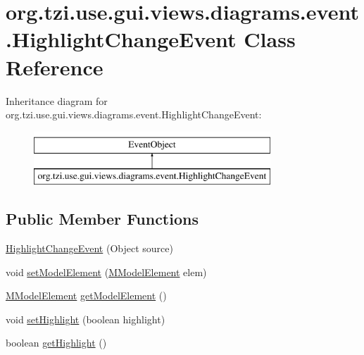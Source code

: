 \hypertarget{classorg_1_1tzi_1_1use_1_1gui_1_1views_1_1diagrams_1_1event_1_1_highlight_change_event}{\section{org.\-tzi.\-use.\-gui.\-views.\-diagrams.\-event.\-Highlight\-Change\-Event Class Reference}
\label{classorg_1_1tzi_1_1use_1_1gui_1_1views_1_1diagrams_1_1event_1_1_highlight_change_event}
}
Inheritance diagram for org.\-tzi.\-use.\-gui.\-views.\-diagrams.\-event.\-Highlight\-Change\-Event\-:\begin{figure}[H]
\begin{center}
\leavevmode
\includegraphics[height=2.000000cm]{classorg_1_1tzi_1_1use_1_1gui_1_1views_1_1diagrams_1_1event_1_1_highlight_change_event}
\end{center}
\end{figure}
\subsection*{Public Member Functions}
\begin{DoxyCompactItemize}
\item 
\hyperlink{classorg_1_1tzi_1_1use_1_1gui_1_1views_1_1diagrams_1_1event_1_1_highlight_change_event_a44aa5a93b6c7e41cb79c1029546279d3}{Highlight\-Change\-Event} (Object source)
\item 
void \hyperlink{classorg_1_1tzi_1_1use_1_1gui_1_1views_1_1diagrams_1_1event_1_1_highlight_change_event_a8bd301afb193ff3b5a89ad8994da73d2}{set\-Model\-Element} (\hyperlink{interfaceorg_1_1tzi_1_1use_1_1uml_1_1mm_1_1_m_model_element}{M\-Model\-Element} elem)
\item 
\hyperlink{interfaceorg_1_1tzi_1_1use_1_1uml_1_1mm_1_1_m_model_element}{M\-Model\-Element} \hyperlink{classorg_1_1tzi_1_1use_1_1gui_1_1views_1_1diagrams_1_1event_1_1_highlight_change_event_a52ac29077827742663e5287d0fee2761}{get\-Model\-Element} ()
\item 
void \hyperlink{classorg_1_1tzi_1_1use_1_1gui_1_1views_1_1diagrams_1_1event_1_1_highlight_change_event_a8dc908a8bc90bf534bdda447463c012b}{set\-Highlight} (boolean highlight)
\item 
boolean \hyperlink{classorg_1_1tzi_1_1use_1_1gui_1_1views_1_1diagrams_1_1event_1_1_highlight_change_event_a8e0b85e373fdf54e0aadb33d534efc06}{get\-Highlight} ()
\end{DoxyCompactItemize}


